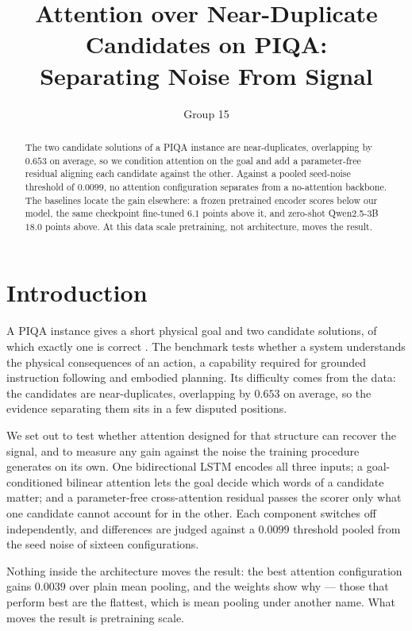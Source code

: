 \documentclass[11pt]{article}
\title{Attention over Near-Duplicate Candidates on PIQA:\\
Separating Noise From Signal}
\author{Group 15}
\date{}
\begin{document}
\maketitle

\begin{abstract}
The two candidate solutions of a PIQA instance are near-duplicates,
overlapping by $0.653$ on average, so we condition attention on the goal and
add a parameter-free residual aligning each candidate against the other.
Against a pooled seed-noise threshold of $0.0099$, no attention configuration
separates from a no-attention backbone. The baselines locate the gain
elsewhere: a frozen pretrained encoder scores below our model, the same
checkpoint fine-tuned $6.1$ points above it, and zero-shot Qwen2.5-3B $18.0$
points above. At this data scale pretraining, not architecture, moves the
result.
\end{abstract}

\section{Introduction}

A PIQA instance gives a short physical goal and two candidate solutions, of
which exactly one is correct \citep{bisk2020piqa}. The benchmark tests whether
a system understands the physical consequences of an action, a capability
required for grounded instruction following and embodied planning. Its
difficulty comes from the data: the candidates are near-duplicates,
overlapping by $0.653$ on average, so the evidence separating them sits in a
few disputed positions.

We set out to test whether attention designed for that structure can recover
the signal, and to measure any gain against the noise the training procedure
generates on its own. One bidirectional LSTM encodes all three inputs; a
goal-conditioned bilinear attention \citep{luong2015attention} lets the goal
decide which words of a candidate matter; and a parameter-free
cross-attention residual \citep{chen2017esim} passes the scorer only what one
candidate cannot account for in the other. Each component switches off
independently, and differences are judged against a $0.0099$ threshold pooled
from the seed noise of sixteen configurations.

Nothing inside the architecture moves the result: the best attention
configuration gains $0.0039$ over plain mean pooling, and the weights show why
--- those that perform best are the flattest, which is mean pooling under
another name. What moves the result is pretraining scale.
\end{document}
